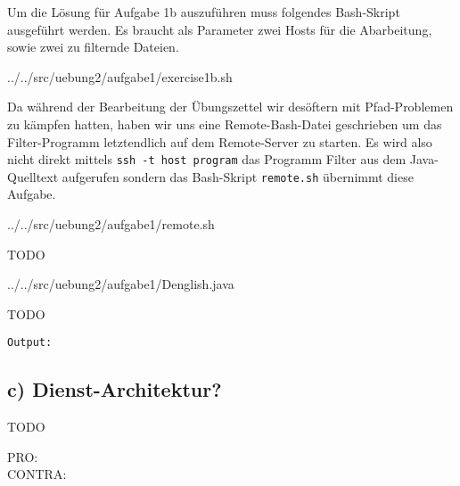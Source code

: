 	Um die Lösung für Aufgabe 1b auszuführen muss folgendes Bash-Skript ausgeführt werden.
	Es braucht als Parameter zwei Hosts für die Abarbeitung, sowie zwei zu filternde Dateien.
	
	{../../src/uebung2/aufgabe1/exercise1b.sh}

	Da während der Bearbeitung der Übungszettel wir desöftern mit Pfad-Problemen zu kämpfen hatten,
	haben wir uns eine Remote-Bash-Datei geschrieben um das Filter-Programm letztendlich auf dem Remote-Server zu starten.
	Es wird also nicht direkt mittels \texttt{ssh -t host program} das Programm Filter aus dem Java-Quelltext aufgerufen
	sondern das Bash-Skript \texttt{remote.sh} übernimmt diese Aufgabe. 
	
	{../../src/uebung2/aufgabe1/remote.sh}

{\sf TODO}


	{../../src/uebung2/aufgabe1/Denglish.java}

{\sf TODO}

\begin{verbatim}
Output:
\end{verbatim}

	
\subsection*{c) Dienst-Architektur?}
{\sf TODO}

\begin{description}
\item[PRO:]
\item[CONTRA:]
\end{description}
